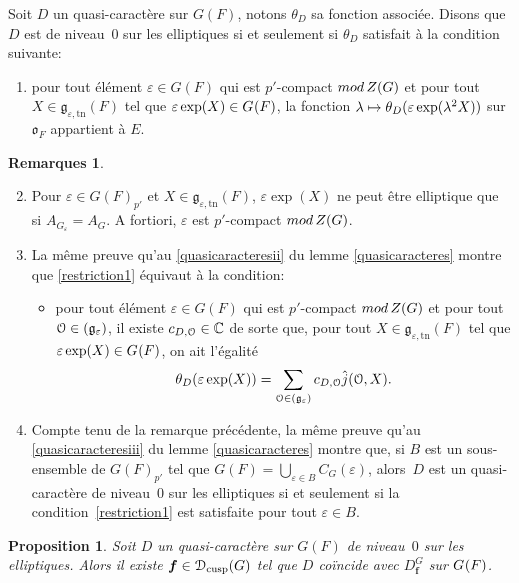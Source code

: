 \documentclass[11pt]{article}
\newcommand{\skpt}{\smallskip}
\numberwithin{equation}{section}\providecommand{\og}{«\,}\providecommand{\fg}{\,»}
\let\mathcal \EuScript
\newcommand{\NoChangel}[1]{%
\expandafter\let\csname old\string#1\endcsname=#1
\let#1=\relax
\newcommand{#1}{\mathcode`l="716C\csname old\string#1\endcsname\mathcode`l="7160 }%
}
\let\epsilon\varepsilon
\newcommand\mto{\mathchoice{\longmapsto}{\mapsto}{\mapsto}{\mapsto}}
\newcommand{\rmod}{\textup{mod}\,}
\newcommand{\frg}{\mathfrak{g}}
\newcommand{\fro}{\mathfrak{o}}
\newcommand{\cusp}{\mathrm{cusp}}
\newcommand{\rell}{\mathrm{ell}} \NoChangel{\rell}
\newcommand{\Nil}{\mathrm{Nil}} \NoChangel{\Nil}
\newcommand{\tn}{\mathrm{tn}}
\newcommand{\bmf}{\boldsymbol{f}}
\newcommand{\cD}{\mathcal{D}}
\newcommand{\cO}{\mathcal{O}}
\newcommand{\CC}{\mathbb{C}}
\theoremstyle{plain}
\newtheorem*{prop*}{Proposition}
\theoremstyle{definition}
\newtheorem*{rems*}{Remarques}
\begin{document}
Soit $D$ un quasi-caractère sur $G(F)$, notons $\theta_{D}$ sa fonction associée. Disons que $D$ est de niveau~$0$ sur les elliptiques si et seulement si $\theta_{D}$ satisfait à la condition suivante:
\begin{enumerate}
\item\label{restriction1}
pour tout élément $\epsilon\!\in\!G(F)$ qui est $p'$-compact $\rmod Z(G)$ et pour tout $X\!\in\!\frg_{\epsilon,\tn}(F)$ tel que $\epsilon \exp(X)\in G_{\rell}(F)$, la fonction $\lambda\mto \theta_{D}(\epsilon \exp(\lambda^2X))$ sur $\fro_{F}$ appartient à $E$.
\end{enumerate}

\skpt
\begin{rems*}
\begin{enumerate}\setcounter{enumi}{1}
\item\label{restriction2}
Pour $\epsilon\!\in\!G(F)_{p'}$ et $X\!\in\!\frg_{\epsilon,\tn}(F)$, $\epsilon \exp(X)$ ne peut être elliptique que si $A_{G_{\epsilon}}\!=\!A_{G}$. A fortiori, $\epsilon$ est $p'$-compact $\rmod Z(G)$.

\item\label{restriction3}
La même preuve qu'au \eqref{quasicaracteresii} du lemme \ref{quasicaracteres} montre que \eqref{restriction1} équivaut à la condition:
\begin{itemize}
\item
pour tout élément $\epsilon\in G(F)$ qui est $p'$-compact $\rmod Z(G)$ et pour tout $\cO\in \Nil(\frg_{\epsilon})$, il existe $c_{D,\cO}\in \CC$ de sorte que, pour tout $X\in \frg_{\epsilon,\tn}(F)$ tel que $\epsilon \exp(X)\in G_{\rell}(F)$, on ait l'égalité
\[
\theta_{D}(\epsilon \exp(X))=\sum_{\cO\in \Nil(\frg_{\epsilon})}c_{D,\cO}\hat{j}(\cO,X).
\]
\end{itemize}

\item\label{restriction4}
Compte tenu de la remarque précédente, la même preuve qu'au \eqref{quasicaracteresiii} du lemme \ref{quasicaracteres} montre que, si $B$ est un sous-ensemble de $G(F)_{p'}$ tel que $G(F)=\bigcup_{\epsilon\in B} C_{G}(\epsilon)$, alors~$D$ est un quasi-caractère de niveau~$0$ sur les elliptiques si et seulement si la condition~\eqref{restriction1} est satisfaite pour tout $\epsilon\in B$.
\end{enumerate}
\end{rems*}

\begin{prop*}
Soit $D$ un quasi-caractère sur $G(F)$ de niveau~$0$ sur les elliptiques. Alors il existe $\bmf\in \cD_{\cusp}(G)$ tel que $D$ coïncide avec $D^G_{\bmf}$ sur $G_{\rell}(F)$.
\end{prop*}
\end{document}
